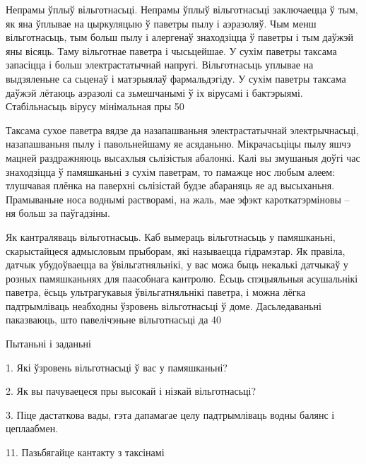 Непрамы ўплыў вільготнасьці. Непрамы ўплыў вільготнасьці заключаецца ў тым, як яна ўплывае на цыркуляцыю ў паветры пылу і аэразоляў. Чым менш вільготнасьць, тым больш пылу і алергенаў знаходзіцца ў паветры і тым даўжэй яны вісяць. Таму вільготнае паветра і чысьцейшае. У сухім паветры таксама запасіцца і больш электрастатычнай напругі. Вільготнасьць уплывае на выдзяленьне са сьценаў і матэрыялаў фармальдэгіду. У сухім паветры таксама даўжэй лётаюць аэразолі са зьмешчанымі ў іх вірусамі і бактэрыямі. Стабільнасьць вірусу мінімальная пры 50%

Таксама сухое паветра вядзе да назапашваньня электрастатычнай электрычнасьці, назапашваньня пылу і павольнейшаму яе асяданьню. Мікрачасьціцы пылу яшчэ мацней раздражняюць высахлыя сьлізістыя абалонкі. Калі вы змушаныя доўгі час знаходзіцца ў памяшканьні з сухім паветрам, то памажце нос любым алеем: тлушчавая плёнка на паверхні сьлізістай будзе абараняць яе ад высыханьня. Прамываньне носа воднымі растворамі, на жаль, мае эфэкт кароткатэрміновы – ня больш за паўгадзіны.




Як кантраляваць вільготнасьць. Каб вымераць вільготнасьць у памяшканьні, скарыстайцеся адмысловым прыборам, які называецца гідрамэтар. Як правіла, датчык убудоўваецца ва ўвільгатняльнікі, у вас можа быць некалькі датчыкаў у розных памяшканьнях для паасобнага кантролю. Ёсьць спэцыяльныя асушальнікі паветра, ёсьць ультрагукавыя ўвільгатняльнікі паветра, і можна лёгка падтрымліваць неабходны ўзровень вільготнасьці ў доме. Дасьледаваньні паказваюць, што павелічэньне вільготнасьці да 40%

Пытаньні і заданьні

1. Які ўзровень вільготнасьці ў вас у памяшканьні?

2. Як вы пачуваецеся пры высокай і нізкай вільготнасьці?

3. Піце дастаткова вады, гэта дапамагае целу падтрымліваць водны балянс і цеплаабмен.


11. Пазьбягайце кантакту з таксінамі

